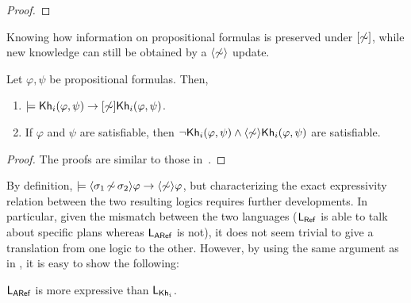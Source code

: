 \begin{proof}
%
%
%
\end{proof}

Knowing how information on propositional formulas is preserved under $[\not\sim]$, while new knowledge can still be obtained by a $\langle \not\sim \rangle$ update.
\medskip

\begin{proposition}\label{prop:aref-preserves-gains}
Let $\varphi,\psi$ be propositional formulas. Then, 
\begin{enumerate}
\item\label{itm:aref:preservesknowledge} $\models {\sf Kh}_i(\varphi,\psi) \rightarrow [\not\sim]{\sf Kh}_i(\varphi,\psi)$.
\item\label{itm:aref:gainsknowledge} If $\varphi$ and $\psi$ are satisfiable, then $\neg{\sf Kh}_i(\varphi,\psi) \wedge \langle \not\sim \rangle{\sf Kh}_i(\varphi,\psi)$ are satisfiable.
\end{enumerate}
\end{proposition}
\begin{proof}
The proofs are similar to those in~.
\end{proof}

By definition, $\models \langle \sigma_1{\,\not\sim\,}\sigma_2 \rangle\varphi \rightarrow \langle \not\sim \rangle\varphi$, but characterizing the exact expressivity relation between the two resulting logics requires further developments.
In particular, given the mismatch between the two languages ($\mathsf{L_{Ref}}$ is able to talk about specific plans whereas $\mathsf{L_{ARef}}$ is not), it does not seem trivial to give a translation from one logic to the other.
However, by using the same argument as in , it is easy to show the following:

\medskip

\begin{proposition}\label{prop:exparef}
$\mathsf{L_{ARef}}$ is more expressive than $\mathsf{L}_{{\sf Kh}_i}$.
\end{proposition}

